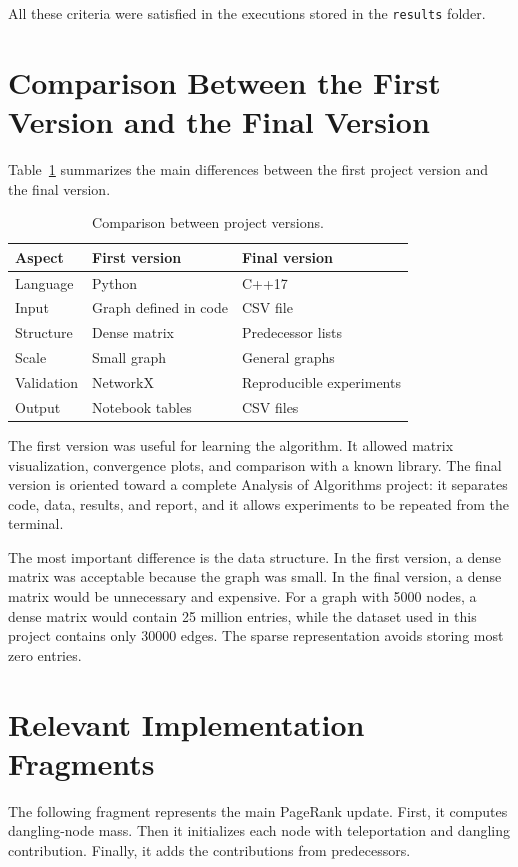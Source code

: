 \documentclass[runningheads]{llncs}
\begin{document}
All these criteria were satisfied in the executions stored in the \texttt{results} folder.

\section{Comparison Between the First Version and the Final Version}

Table~\ref{tab:comparison} summarizes the main differences between the first project version and the final version.

\begin{table}
\caption{Comparison between project versions.}\label{tab:comparison}
\begin{tabular}{|l|l|l|}
\hline
Aspect & First version & Final version\\
\hline
Language & Python & C++17\\
Input & Graph defined in code & CSV file\\
Structure & Dense matrix & Predecessor lists\\
Scale & Small graph & General graphs\\
Validation & NetworkX & Reproducible experiments\\
Output & Notebook tables & CSV files\\
\hline
\end{tabular}
\end{table}

The first version was useful for learning the algorithm. It allowed matrix visualization, convergence plots, and comparison with a known library. The final version is oriented toward a complete Analysis of Algorithms project: it separates code, data, results, and report, and it allows experiments to be repeated from the terminal.

The most important difference is the data structure. In the first version, a dense matrix was acceptable because the graph was small. In the final version, a dense matrix would be unnecessary and expensive. For a graph with 5000 nodes, a dense matrix would contain 25 million entries, while the dataset used in this project contains only 30000 edges. The sparse representation avoids storing most zero entries.

\section{Relevant Implementation Fragments}

The following fragment represents the main PageRank update. First, it computes dangling-node mass. Then it initializes each node with teleportation and dangling contribution. Finally, it adds the contributions from predecessors.
\end{document}
